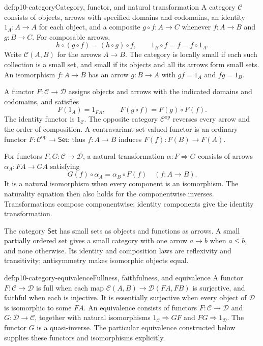 \begin{hbdefinition}{def:p10-category}{Category, functor, and natural transformation}
A category \(\mathcal C\) consists of objects, arrows with specified
domains and codomains, an identity \(1_A:A\to A\) for each object,
and a composite \(g\circ f:A\to C\) whenever \(f:A\to B\) and
\(g:B\to C\).  For composable arrows,
\[
 h\circ(g\circ f)=(h\circ g)\circ f,\qquad
 1_B\circ f=f=f\circ1_A.
\]
Write \(\mathcal C(A,B)\) for the arrows \(A\to B\).
The category is locally small if each such collection is a small
set, and small if its objects and all its arrows form small sets.
An isomorphism \(f:A\to B\) has an arrow \(g:B\to A\) with
\(g f=1_A\) and \(f g=1_B\).

A functor \(F:\mathcal C\to\mathcal D\) assigns objects and arrows
with the indicated domains and codomains, and satisfies
\[
 F(1_A)=1_{F A},\qquad F(g\circ f)=F(g)\circ F(f).
\]
The identity functor is \(1_{\mathcal C}\).
The opposite category \(\mathcal C^{\mathrm{op}}\) reverses every
arrow and the order of composition.  A contravariant set-valued
functor is an ordinary functor
\(F:\mathcal C^{\mathrm{op}}\to\mathsf{Set}\): thus \(f:A\to B\)
induces \(F(f):F(B)\to F(A)\).

For functors \(F,G:\mathcal C\to\mathcal D\), a natural
transformation \(\alpha:F\Rightarrow G\) consists of arrows
\(\alpha_A:F A\to G A\) satisfying
\[
                  G(f)\circ\alpha_A=\alpha_B\circ F(f)
                  \quad(f:A\to B).
\]
It is a natural isomorphism when every component is an
isomorphism.  The naturality equation then also holds for the
componentwise inverses.  Transformations compose componentwise;
identity components give the identity transformation.
\end{hbdefinition}

The category \(\mathsf{Set}\) has small sets as objects and functions
as arrows.  A small partially ordered set gives a small category with one
arrow \(a\to b\) when \(a\leq b\), and none otherwise.  Its identity
and composition laws are reflexivity and transitivity; antisymmetry
makes isomorphic objects equal.

\begin{hbdefinition}{def:p10-category-equivalence}{Fullness, faithfulness, and equivalence}
A functor \(F:\mathcal C\to\mathcal D\) is full when each map
\(\mathcal C(A,B)\to\mathcal D(F A,F B)\) is surjective, and faithful
when each is injective.  It is essentially surjective when every
object of \(\mathcal D\) is isomorphic to some \(F A\).
An equivalence consists of functors \(F:\mathcal C\to\mathcal D\)
and \(G:\mathcal D\to\mathcal C\), together with natural
isomorphisms \(1_{\mathcal C}\Rightarrow GF\) and
\(FG\Rightarrow1_{\mathcal D}\).
The functor \(G\) is a quasi-inverse.  The particular equivalence
constructed below supplies these functors and isomorphisms
explicitly.
\end{hbdefinition}

